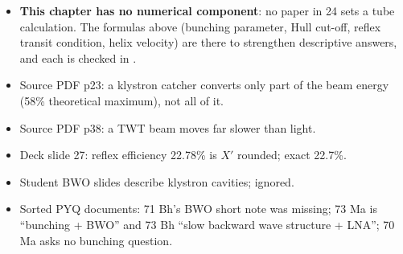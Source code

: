 \begin{itemize}
  \item \textbf{This chapter has no numerical component}: no paper in 24 sets a tube
    calculation. The formulas above (bunching parameter, Hull cut-off, reflex transit
    condition, helix velocity) are there to strengthen descriptive answers, and each is
    checked in .
\end{itemize}

\begin{itemize}
  \item Source PDF p23: a klystron catcher converts only part of the beam energy (58\%
    theoretical maximum), not all of it.
  \item Source PDF p38: a TWT beam moves far slower than light.
  \item Deck slide 27: reflex efficiency 22.78\% is $X'$ rounded; exact 22.7\%.
  \item Student BWO slides describe klystron cavities; ignored.
  \item Sorted PYQ documents: 71 Bh's BWO short note was missing; 73 Ma is ``bunching +
    BWO'' and 73 Bh ``slow backward wave structure + LNA''; 70 Ma asks no bunching question.
\end{itemize}
